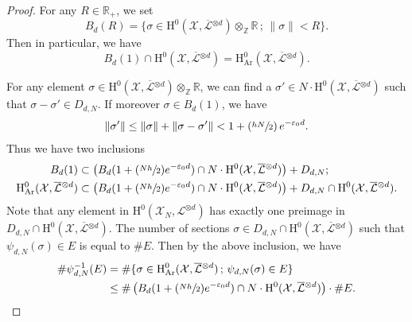 \documentclass[11pt]{article}
\numberwithin{equation}{section}
\newcommand{\Psfrac}[2]{(\sfrac{#1}{#2})}
\newcommand{\sep}{\,;\,}
\theoremstyle{plain}
\theoremstyle{definition}
\newcommand{\ho}{\mathrm{H}}
\newcommand{\X}{\mathcal{X}}
\newcommand{\Li}{\overline{\mathcal{L}}{}}
\newcommand{\li}{\mathcal{L}}
\newcommand{\Z}{\mathbb{Z}}
\newcommand{\R}{\mathbb{R}}
\begin{document}
\begin{proof}[Proof]
For any $R\in \R_+$, we set
\[
B_d(R)=\{ \sigma\in \ho^0(\X,\Li^{\otimes d})\otimes_{\mathbb{Z}}\mathbb{R}\sep \lVert\sigma\rVert<R\}.
\]
Then in particular, we have
\[
B_d(1)\cap \ho^0(\X,\Li^{\otimes d})=\ho^0_{\mathrm{Ar}}(\X,\Li^{\otimes d}).
\]

For any element $\sigma\in \ho^0(\X,\Li^{\otimes d})\otimes_{\Z}\R$, we can find a $\sigma'\in N\cdot\ho^0(\X,\Li^{\otimes d})$ such that $\sigma-\sigma'\in D_{d, N}$. If moreover $\sigma \in B_d(1)$, we have
\[
\lVert \sigma' \rVert \leq \lVert \sigma\rVert + \lVert \sigma-\sigma' \rVert <1+\Psfrac{hN}{2}\,e^{-\varepsilon_0 d}.
\]
Thus we have two inclusions
\begin{align*}
B_d(1)&\subset \left(B_d(1+\Psfrac{Nh}{2}e^{-\varepsilon_0 d}) \cap N\cdot \ho^0(\X,\Li^{\otimes d}) \right)+D_{d,N};\\
\ho^0_{\mathrm{Ar}}(\X,\Li^{\otimes d})&\subset \left(B_d(1+\Psfrac{Nh}{2}e^{-\varepsilon_0 d}) \cap N\cdot \ho^0(\X,\Li^{\otimes d}) \right)+D_{d,N}\cap \ho^0(\X,\Li^{\otimes d}).
\end{align*}
Note that any element in $\ho^0(\X_N,\li^{\otimes d}) $ has exactly one preimage in $D_{d,N}\cap \ho^0(\X,\Li^{\otimes d}) $. The number of sections $\sigma\in D_{d,N}\cap \ho^0(\X,\Li^{\otimes d})$ such that $\psi_{d,N}(\sigma) \in E$ is equal to $\#E$. Then by the above inclusion, we have
\begin{align*}
\#\psi_{d,N}^{-1}(E)&=\#\{ \sigma\in \ho^0_{\mathrm{Ar}}(\X,\Li^{\otimes d})\sep \psi_{d,N}(\sigma)\in E \} \\
&\leq \#\left(B_d(1+\Psfrac{Nh}{2}e^{-\varepsilon_0 d}) \cap N\cdot \ho^0(\X,\Li^{\otimes d}) \right)\cdot \#E.
\end{align*}


\end{proof}
\end{document}
